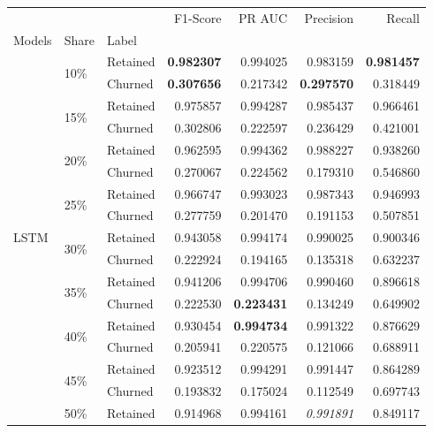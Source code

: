 \documentclass{kththesis}
\begin{document}
\begin{table}
\centering
\begin{tabular}{lllrrrr}
\toprule
     &     &          &  F1-Score &    PR AUC &  Precision &    Recall \\
Models & Share & Label &           &           &            &           \\
\midrule
\multirow{18}{*}{LSTM} & \multirow{2}{*}{10\%} & Retained &  \textbf{0.982307} &  0.994025 &   0.983159 &  \textbf{0.981457} \\
     &     & Churned &  \textbf{0.307656} &  0.217342 &   \textbf{0.297570} &  0.318449 \\
\cline{2-7}
     & \multirow{2}{*}{15\%} & Retained &  0.975857 &  0.994287 &   0.985437 &  0.966461 \\
     &     & Churned &  0.302806 &  0.222597 &   0.236429 &  0.421001 \\
\cline{2-7}
     & \multirow{2}{*}{20\%} & Retained &  0.962595 &  0.994362 &   0.988227 &  0.938260 \\
     &     & Churned &  0.270067 &  0.224562 &   0.179310 &  0.546860 \\
\cline{2-7}
     & \multirow{2}{*}{25\%} & Retained &  0.966747 &  0.993023 &   0.987343 &  0.946993 \\
     &     & Churned &  0.277759 &  0.201470 &   0.191153 &  0.507851 \\
\cline{2-7}
     & \multirow{2}{*}{30\%} & Retained &  0.943058 &  0.994174 &   0.990025 &  0.900346 \\
     &     & Churned &  0.222924 &  0.194165 &   0.135318 &  0.632237 \\
\cline{2-7}
     & \multirow{2}{*}{35\%} & Retained &  0.941206 &  0.994706 &   0.990460 &  0.896618 \\
     &     & Churned &  0.222530 &  \textbf{0.223431} &   0.134249 &  0.649902 \\
\cline{2-7}
     & \multirow{2}{*}{40\%} & Retained &  0.930454 &  \textbf{0.994734} &   0.991322 &  0.876629 \\
     &     & Churned &  0.205941 &  0.220575 &   0.121066 &  0.688911 \\
\cline{2-7}
     & \multirow{2}{*}{45\%} & Retained &  0.923512 &  0.994291 &   0.991447 &  0.864289 \\
     &     & Churned &  0.193832 &  0.175024 &   0.112549 &  0.697743 \\
\cline{2-7}
     & \multirow{2}{*}{50\%} & Retained &  0.914968 &  0.994161 &   \textit{0.991891} &  0.849117 \\

\end{tabular}
\end{table}
\end{document}
